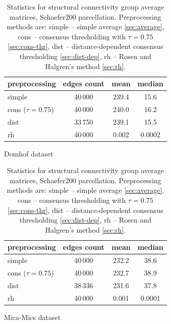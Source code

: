 \begin{table}
\begin{subtable}{\textwidth}
    \centering
    \begin{tabular}{l | c | c | c }
        preprocessing & edges count & mean	& median\\
        \midrule
        simple             &40\,000  &239.4  &15.6	\\
        cons ($\tau=0.75$) &40\,000	&240.0	&16.2	\\
        dist               &33\,750	&239.1	&15.5	\\
        rh                 &40\,000	&0.002	&0.0002 \\
    \end{tabular}
    \caption{Domhof dataset}
    \label{tab:sc_stats}
\end{subtable}

\bigskip

\begin{subtable}{\textwidth}
    \centering
    \begin{tabular}{l | c | c | c }
        preprocessing & edges count & mean	& median\\
        \midrule
        simple             &40\,000  &232.2	&38.6	\\
        cons ($\tau=0.75$) &40\,000	&232.7	&38.9	\\
        dist               &38\,336	&231.6	&37.8	\\
        rh                 &40\,000	&0.001	&0.0001 \\
    \end{tabular}
    \caption{Mica-Mics dataset}
    \label{tab:sc_stats}
\end{subtable}
    \caption[Statistics for structural connectivity group average matrices]{Statistics for structural connectivity group average matrices, Schaefer200 parcellation. Preprocessing methods are: simple -- simple average \ref{sec:average}, cons -- consensus thresholding with $\tau=0.75$ \ref{sec:cons-thr}, dist -- distance-dependent consensus thresholding \ref{sec:dist-dep}, rh -- Rosen and Halgren's method \ref{sec:rh}. }
\end{table}

